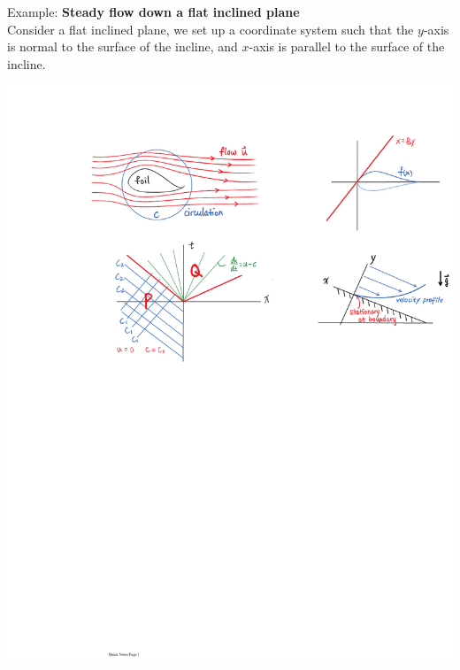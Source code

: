 \documentclass[11pt]{book}
\theoremstyle{break}
\theoremstyle{break}
\newcommand{\example}{\color{green}Example: \color{black}}
\begin{document}
\newpage
\example \textbf{Steady flow down a flat inclined plane}\\
Consider a flat inclined plane,  we set up a coordinate system such that the $y$-axis is normal to the surface of the incline, and $x$-axis is parallel to the surface of the incline. 
\begin{center}
\includegraphics[scale=1.19]{incline.pdf}
\end{center}
\end{document}
